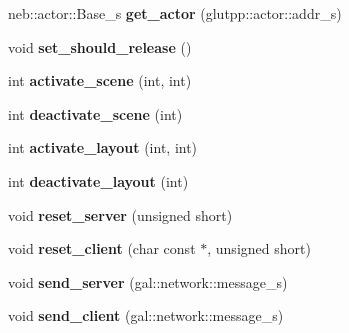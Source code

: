 \begin{DoxyCompactItemize}
\item 
\hypertarget{classneb_1_1app_acd137ce9a84bac35958d05c9d31ce113}{
neb::actor::Base\_\-s {\bfseries get\_\-actor} (glutpp::actor::addr\_\-s)}
\label{classneb_1_1app_acd137ce9a84bac35958d05c9d31ce113}

\item 
\hypertarget{classneb_1_1app_a585d3455638323086057befeb4e91a1b}{
void {\bfseries set\_\-should\_\-release} ()}
\label{classneb_1_1app_a585d3455638323086057befeb4e91a1b}

\item 
\hypertarget{classneb_1_1app_aa558ff3c281cd6f6b7bdca7f5a7807ff}{
int {\bfseries activate\_\-scene} (int, int)}
\label{classneb_1_1app_aa558ff3c281cd6f6b7bdca7f5a7807ff}

\item 
\hypertarget{classneb_1_1app_a54affa2aa2f29724e15dee3fb4f01b2b}{
int {\bfseries deactivate\_\-scene} (int)}
\label{classneb_1_1app_a54affa2aa2f29724e15dee3fb4f01b2b}

\item 
\hypertarget{classneb_1_1app_a421f2d98f0857f6d73824740019c94f1}{
int {\bfseries activate\_\-layout} (int, int)}
\label{classneb_1_1app_a421f2d98f0857f6d73824740019c94f1}

\item 
\hypertarget{classneb_1_1app_a5b5b9384258da420e426d15f7c0753f3}{
int {\bfseries deactivate\_\-layout} (int)}
\label{classneb_1_1app_a5b5b9384258da420e426d15f7c0753f3}

\item 
\hypertarget{classneb_1_1app_a88525d86c44907e36e534ffb5d8c9f04}{
void {\bfseries reset\_\-server} (unsigned short)}
\label{classneb_1_1app_a88525d86c44907e36e534ffb5d8c9f04}

\item 
\hypertarget{classneb_1_1app_a94908472755f4f20846a75a5368825cb}{
void {\bfseries reset\_\-client} (char const $\ast$, unsigned short)}
\label{classneb_1_1app_a94908472755f4f20846a75a5368825cb}

\item 
\hypertarget{classneb_1_1app_a8250d1d585de859af0ae8098db7ad011}{
void {\bfseries send\_\-server} (gal::network::message\_\-s)}
\label{classneb_1_1app_a8250d1d585de859af0ae8098db7ad011}

\item 
\hypertarget{classneb_1_1app_a197b5f2b57db91d1fe622a9f40c65e15}{
void {\bfseries send\_\-client} (gal::network::message\_\-s)}
\label{classneb_1_1app_a197b5f2b57db91d1fe622a9f40c65e15}


\end{DoxyCompactItemize}
